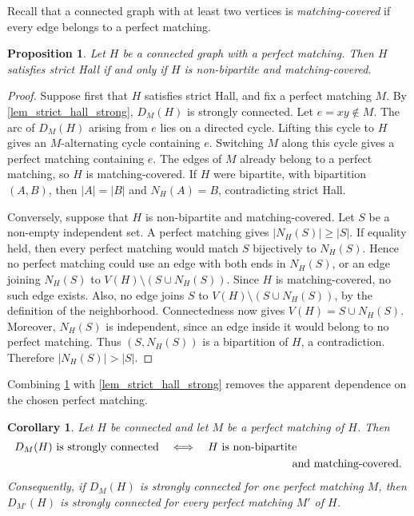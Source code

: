 \documentclass[preprint,12pt]{elsarticle}
\theoremstyle{plain}
\newtheorem{corollary}[theorem]{Corollary}
\newtheorem{proposition}[theorem]{Proposition}
\begin{document}
Recall that a connected graph with at least two vertices is
\emph{matching-covered} if every edge belongs to a perfect matching.

\begin{proposition}\label{prop_strict_hall_matching_covered}
Let \(H\) be a connected graph with a perfect matching.  Then \(H\) satisfies
strict Hall if and only if \(H\) is non-bipartite and matching-covered.
\end{proposition}

\begin{proof}
Suppose first that \(H\) satisfies strict Hall, and fix a perfect matching
\(M\).  By \cref{lem_strict_hall_strong}, \(D_M(H)\) is strongly connected.
Let \(e=xy\notin M\).  The arc of \(D_M(H)\) arising from \(e\) lies on a
directed cycle.  Lifting this cycle to \(H\) gives an \(M\)-alternating cycle
containing \(e\).  Switching \(M\) along this cycle gives a perfect matching
containing \(e\).  The edges of \(M\) already belong to a perfect matching,
so \(H\) is matching-covered.  If \(H\) were bipartite, with bipartition
\((A,B)\), then \(|A|=|B|\) and \(N_H(A)=B\), contradicting strict Hall.

Conversely, suppose that \(H\) is non-bipartite and matching-covered.  Let
\(S\) be a non-empty independent set.  A perfect matching gives
\(|N_H(S)|\ge |S|\).  If equality held, then every perfect matching would
match \(S\) bijectively to \(N_H(S)\).  Hence no perfect matching could use
an edge with both ends in \(N_H(S)\), or an edge joining \(N_H(S)\) to
\(V(H)\setminus(S\cup N_H(S))\).  Since \(H\) is matching-covered, no such
edge exists.  Also, no edge joins \(S\) to
\(V(H)\setminus(S\cup N_H(S))\), by the definition of the neighborhood.
Connectedness now gives \(V(H)=S\cup N_H(S)\).  Moreover, \(N_H(S)\) is
independent, since an edge inside it would belong to no perfect matching.
Thus \((S,N_H(S))\) is a bipartition of \(H\), a contradiction.  Therefore
\(|N_H(S)|>|S|\).
\end{proof}

Combining \cref{prop_strict_hall_matching_covered} with
\cref{lem_strict_hall_strong} removes the apparent dependence on the chosen
perfect matching.

\begin{corollary}\label{cor_alternating_digraph_matching_covered}
Let \(H\) be connected and let \(M\) be a perfect matching of \(H\).  Then
\[
\begin{aligned}
D_M(H)\text{ is strongly connected}
&\quad\Longleftrightarrow\quad
H\text{ is non-bipartite}\\
&\hspace{42mm}\text{and matching-covered}.
\end{aligned}
\]
Consequently, if \(D_M(H)\) is strongly connected for one perfect matching
\(M\), then \(D_{M'}(H)\) is strongly connected for every perfect matching
\(M'\) of \(H\).
\end{corollary}
\end{document}
